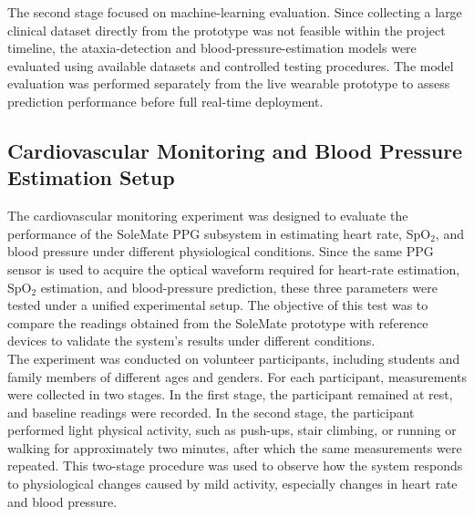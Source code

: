 \noindent The second stage focused on machine-learning evaluation. Since collecting a large clinical dataset directly from the prototype was not feasible within the project timeline, the ataxia-detection and blood-pressure-estimation models were evaluated using available datasets and controlled testing procedures. The model evaluation was performed separately from the live wearable prototype to assess prediction performance before full real-time deployment. \\






\subsection{Cardiovascular Monitoring and Blood Pressure Estimation Setup}
\label{subsec:cardiovascular_bp_setup}

\noindent The cardiovascular monitoring experiment was designed to evaluate the performance of the SoleMate PPG subsystem in estimating heart rate, SpO$_2$, and blood pressure under different physiological conditions. Since the same PPG sensor is used to acquire the optical waveform required for heart-rate estimation, SpO$_2$ estimation, and blood-pressure prediction, these three parameters were tested under a unified experimental setup. The objective of this test was to compare the readings obtained from the SoleMate prototype with reference devices to validate the system's results under different conditions. \\


\noindent The experiment was conducted on volunteer participants, including students and family members of different ages and genders. For each participant, measurements were collected in two stages. In the first stage, the participant remained at rest, and baseline readings were recorded. In the second stage, the participant performed light physical activity, such as push-ups, stair climbing, or running or walking for approximately two minutes, after which the same measurements were repeated. This two-stage procedure was used to observe how the system responds to physiological changes caused by mild activity, especially changes in heart rate and blood pressure. \\


